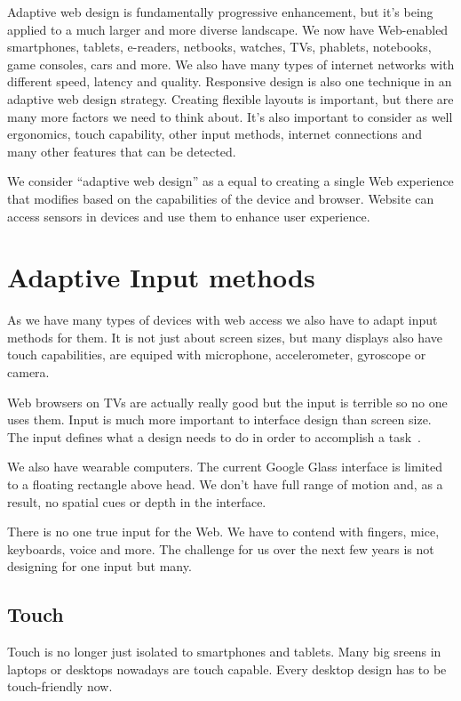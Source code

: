 \documentclass{iitsrc}
\begin{document}
Adaptive web design is fundamentally progressive enhancement, but it's being applied to a much larger and more diverse landscape. We now have Web-enabled smartphones, tablets, e-readers, netbooks, watches, TVs, phablets, notebooks, game consoles, cars and more. We also have many types of internet networks with different speed, latency and quality. Responsive design is also one technique in an adaptive web design strategy. Creating flexible layouts is important, but there are many more factors we need to think about. It's also important to consider as well ergonomics, touch capability, other input methods, internet connections and many other features that can be detected.

We consider ``adaptive web design'' as a equal to creating a single Web experience that modifies based on the capabilities of the device and browser. Website can access sensors in devices and use them to enhance user experience.


\section{Adaptive Input methods}

As we have many types of devices with web access we also have to adapt input methods for them. It is not just about screen sizes, but many displays also have touch capabilities, are equiped with microphone, accelerometer, gyroscope or camera.

Web browsers on TVs are actually really good but the input is terrible so no one uses them. Input is much more important to interface design than screen size. The input defines what a design needs to do in order to accomplish a task~\cite{adaptiveinput}.

We also have wearable computers. The current Google Glass interface is limited to a floating rectangle above head. We don't have full range of motion and, as a result, no spatial cues or depth in the interface.

There is no one true input for the Web. We have to contend with fingers, mice, keyboards, voice and more. The challenge for us over the next few years is not designing for one input but many.

\subsection{Touch} %
\label{sub:touch}

Touch is no longer just isolated to smartphones and tablets. Many big sreens in laptops or desktops nowadays are touch capable. Every desktop design has to be touch-friendly now.
\end{document}
